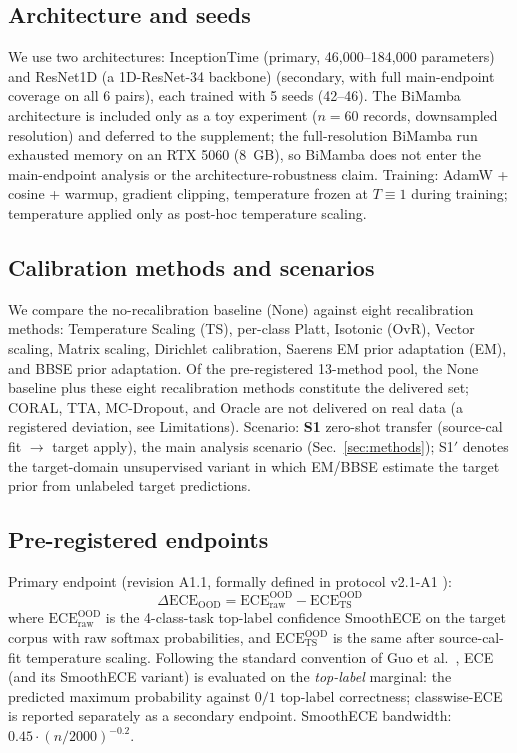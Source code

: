 \documentclass[review,12pt,nonatbib]{elsarticle}
\begin{document}
\subsection{Architecture and seeds}
We use two architectures: InceptionTime (primary, 46{,}000--184{,}000
parameters) and ResNet1D (a 1D-ResNet-34 backbone) (secondary, with full
main-endpoint coverage on all 6 pairs), each trained with 5 seeds
(42--46). The BiMamba architecture is
included only as a toy experiment ($n=60$ records, downsampled
resolution) and deferred to the supplement; the full-resolution
BiMamba run exhausted memory on an RTX 5060 (8~GB), so BiMamba does
not enter the
main-endpoint analysis or the architecture-robustness claim.
Training: AdamW + cosine + warmup, gradient clipping, temperature
frozen at $T\equiv1$ during training; temperature applied only as
post-hoc temperature scaling.

\subsection{Calibration methods and scenarios}
We compare the no-recalibration baseline (None) against eight
recalibration methods: Temperature Scaling (TS), per-class Platt,
Isotonic (OvR), Vector scaling, Matrix scaling, Dirichlet calibration,
Saerens EM prior adaptation (EM), and BBSE prior adaptation.
Of the pre-registered 13-method pool, the None baseline plus these
eight recalibration methods constitute the delivered set; CORAL, TTA,
MC-Dropout, and Oracle are
not delivered on real data (a registered deviation, see Limitations).
Scenario: \textbf{S1} zero-shot transfer (source-cal fit
$\rightarrow$ target apply), the main analysis scenario
(Sec.~\ref{sec:methods}); S1$'$ denotes the target-domain unsupervised
variant in which EM/BBSE estimate the target prior from unlabeled
target predictions.

\subsection{Pre-registered endpoints}
\label{sec:prereg}
Primary endpoint (revision A1.1, formally defined in
protocol v2.1-A1 \cite{protocolv21a1}):
\begin{equation}
    \Delta\text{ECE}_{\text{OOD}}
    = \text{ECE}_{\mathrm{raw}}^{\mathrm{OOD}} - \text{ECE}_{\mathrm{TS}}^{\mathrm{OOD}}
\end{equation}
where $\text{ECE}_{\mathrm{raw}}^{\mathrm{OOD}}$ is the 4-class-task top-label
confidence SmoothECE on
the target corpus with raw softmax probabilities, and
$\text{ECE}_{\mathrm{TS}}^{\mathrm{OOD}}$ is the same after source-cal-fit temperature
scaling. Following the standard convention of Guo et al.\
\cite{guo2017calibration}, ECE (and its SmoothECE variant) is evaluated on
the \emph{top-label} marginal: the predicted maximum probability against
$0/1$ top-label correctness; classwise-ECE is reported separately as a
secondary endpoint. SmoothECE bandwidth: $0.45\cdot(n/2000)^{-0.2}$.
\end{document}
